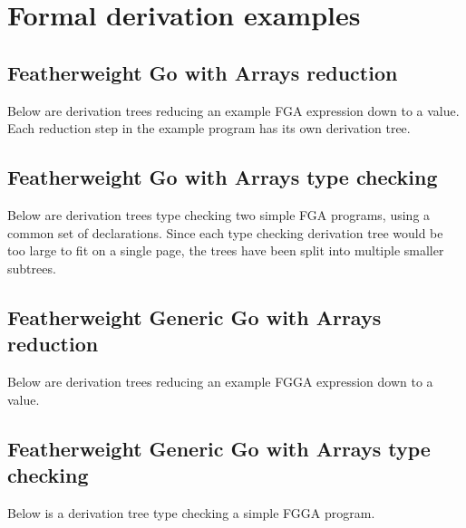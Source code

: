 \section{Formal derivation examples}

\subsection{Featherweight Go with Arrays reduction}
\label{sec:fg-derivation-example}

Below are derivation trees reducing an example FGA expression down to a value.
Each reduction step in the example program has its own derivation tree.



\subsection{Featherweight Go with Arrays type checking}
\label{sec:fg-typing-derivation-example}

Below are derivation trees type checking two simple FGA programs, using a common set
of declarations. Since each type checking derivation tree would be too large to
fit on a single page, the trees have been split into multiple smaller subtrees.



\subsection{Featherweight Generic Go with Arrays reduction}
\label{sec:fgg-derivation-example}

Below are derivation trees reducing an example FGGA expression down to a value.



\subsection{Featherweight Generic Go with Arrays type checking}
\label{sec:fgg-typing-derivation-example}

Below is a derivation tree type checking a simple FGGA program.




